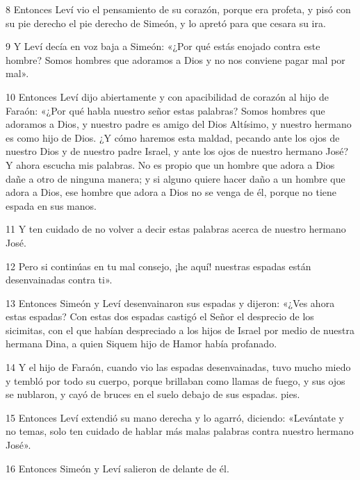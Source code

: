 \par 8 Entonces Leví vio el pensamiento de su corazón, porque era profeta, y pisó con su pie derecho el pie derecho de Simeón, y lo apretó para que cesara su ira.

\par 9 Y Leví decía en voz baja a Simeón: «¿Por qué estás enojado contra este hombre? Somos hombres que adoramos a Dios y no nos conviene pagar mal por mal».

\par 10 Entonces Leví dijo abiertamente y con apacibilidad de corazón al hijo de Faraón: «¿Por qué habla nuestro señor estas palabras? Somos hombres que adoramos a Dios, y nuestro padre es amigo del Dios Altísimo, y nuestro hermano es como hijo de Dios. ¿Y cómo haremos esta maldad, pecando ante los ojos de nuestro Dios y de nuestro padre Israel, y ante los ojos de nuestro hermano José? Y ahora escucha mis palabras. No es propio que un hombre que adora a Dios dañe a otro de ninguna manera; y si alguno quiere hacer daño a un hombre que adora a Dios, ese hombre que adora a Dios no se venga de él, porque no tiene espada en sus manos.

\par 11 Y ten cuidado de no volver a decir estas palabras acerca de nuestro hermano José.

\par 12 Pero si continúas en tu mal consejo, ¡he aquí! nuestras espadas están desenvainadas contra ti».

\par 13 Entonces Simeón y Leví desenvainaron sus espadas y dijeron: «¿Ves ahora estas espadas? Con estas dos espadas castigó el Señor el desprecio de los sicimitas, con el que habían despreciado a los hijos de Israel por medio de nuestra hermana Dina, a quien Siquem hijo de Hamor había profanado.

\par 14 Y el hijo de Faraón, cuando vio las espadas desenvainadas, tuvo mucho miedo y tembló por todo su cuerpo, porque brillaban como llamas de fuego, y sus ojos se nublaron, y cayó de bruces en el suelo debajo de sus espadas. pies.

\par 15 Entonces Leví extendió su mano derecha y lo agarró, diciendo: «Levántate y no temas, solo ten cuidado de hablar más malas palabras contra nuestro hermano José».

\par 16 Entonces Simeón y Leví salieron de delante de él.

